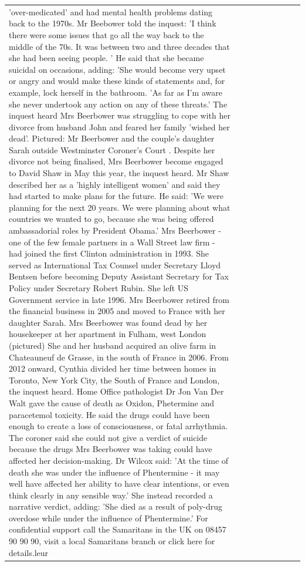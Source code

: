 \begin{table}[H]
\begin{tabular}{lllrlllll}
'over-medicated' and had mental health problems dating back to the 1970s. Mr Beebower told the inquest: 'I think there were some issues that go all the way back to the middle of the 70s. It was between two and three decades that she had been seeing people. ' He said that she became suicidal on occasions, adding: 'She would become very upset or angry and would make these kinds of statements and, for example, lock herself in the bathroom. 'As far as I'm aware she never undertook any action on any of these threats.' The inquest heard Mrs Beerbower was struggling to cope with her divorce from husband John and feared her family 'wished her dead'. Pictured: Mr Beerbower and the couple's daughter Sarah outside Westminster Coroner's Court . Despite her divorce not being finalised, Mrs Beerbower become engaged to David Shaw in May this year, the inquest heard. Mr Shaw described her as a 'highly intelligent women' and said they had started to make plans for the future. He said: 'We were planning for the next 20 years. We were planning about what countries we wanted to go, because she was being offered ambassadorial roles by President Obama.' Mrs Beerbower - one of the few female partners in a Wall Street law firm - had joined the first Clinton administration in 1993. She served as International Tax Counsel under Secretary Lloyd Bentsen before becoming Deputy Assistant Secretary for Tax Policy under Secretary Robert Rubin. She left US Government service in late 1996. Mrs Beerbower retired from the financial business in 2005 and moved to France with her daughter Sarah. Mrs Beerbower was found dead by her housekeeper at her apartment in Fulham, west London (pictured) She and her husband acquired an olive farm in Chateauneuf de Grasse, in the south of France in 2006. From 2012 onward, Cynthia divided her time between homes in Toronto, New York City, the South of France and London, the inquest heard. Home Office pathologist Dr Jon Van Der Walt gave the cause of death as Oxidon, Phetermine and paracetemol toxicity. He said the drugs could have been enough to create a loss of consciousness, or fatal arrhythmia. The coroner said she could not give a verdict of suicide because the drugs Mrs Beerbower was taking could have affected her decision-making. Dr Wilcox said: 'At the time of death she was under the influence of Phentermine - it may well have affected her ability to have clear intentions, or even think clearly in any sensible way.' She instead recorded a narrative verdict, adding: 'She died as a result of poly-drug overdose while under the influence of Phentermine.' For confidential support call the Samaritans in the UK on 08457 90 90 90, visit a local Samaritans branch or click here for details.leur \\

\end{tabular}
\end{table}
